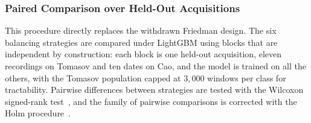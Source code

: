 \subsubsection{Paired Comparison over Held-Out Acquisitions}
\label{sec:chap3PairedComparison}
This procedure directly replaces the withdrawn Friedman design. The six balancing strategies are compared under LightGBM using blocks that are independent by construction: each block is one held-out acquisition, eleven recordings on Tomasov and ten dates on Cao, and the model is trained on all the others, with the Tomasov population capped at $3{,}000$ windows per class for tractability. Pairwise differences between strategies are tested with the Wilcoxon signed-rank test~\cite{wilcoxon1945individual}, and the family of pairwise comparisons is corrected with the Holm procedure~\cite{holm1979simple,demsar2006statistical}.

